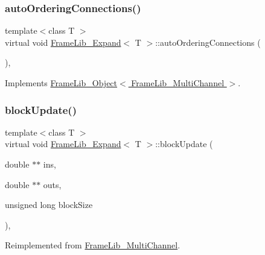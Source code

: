 \subsubsection{\texorpdfstring{auto\+Ordering\+Connections()}{autoOrderingConnections()}}
{\footnotesize\ttfamily template$<$class T $>$ \\
virtual void \hyperlink{class_frame_lib___expand}{Frame\+Lib\+\_\+\+Expand}$<$ T $>$\+::auto\+Ordering\+Connections (\begin{DoxyParamCaption}{ }\end{DoxyParamCaption})\hspace{0.3cm}{\ttfamily [inline]}, {\ttfamily [virtual]}}



Implements \hyperlink{class_frame_lib___object_afa5bb93302a641c23b5eac7ab0dfe516}{Frame\+Lib\+\_\+\+Object$<$ Frame\+Lib\+\_\+\+Multi\+Channel $>$}.

\mbox{\label{class_frame_lib___expand_ae712d631cb99284e91c3f318534b3c03}} 
\subsubsection{\texorpdfstring{block\+Update()}{blockUpdate()}}
{\footnotesize\ttfamily template$<$class T $>$ \\
virtual void \hyperlink{class_frame_lib___expand}{Frame\+Lib\+\_\+\+Expand}$<$ T $>$\+::block\+Update (\begin{DoxyParamCaption}\item[{double $\ast$$\ast$}]{ins,  }\item[{double $\ast$$\ast$}]{outs,  }\item[{unsigned long}]{block\+Size }\end{DoxyParamCaption})\hspace{0.3cm}{\ttfamily [inline]}, {\ttfamily [virtual]}}



Reimplemented from \hyperlink{class_frame_lib___multi_channel_a8ad8f1c0138f32ef0bfb7e4673b34d30}{Frame\+Lib\+\_\+\+Multi\+Channel}.

\mbox{\label{class_frame_lib___expand_adbf3c1e77474e23eacabb395409424e5}} 

